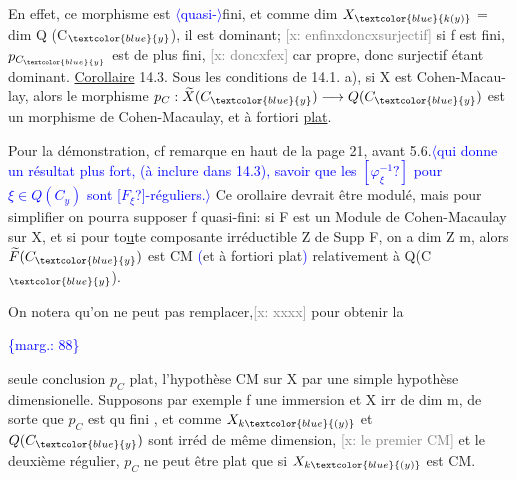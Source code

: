 \documentclass[11pt]{article}
\newcommand{\scanpage}[1]{\par\bigskip\noindent{\small\sffamily[scan #1]}\par}
\newcommand{\hand}[1]{\textcolor{blue}{#1}}
\let\over\relax
\newcommand{\over}[2]{\textcolor{gray}{#1}\textcolor{blue}{\ensuremath{^{\!\nearrow}}#2}}
\newcommand{\inserted}[2][]{\textcolor{blue}{$\langle$#2$\rangle$}}
\newcommand{\margin}[1]{\textcolor{blue}{\{\textsf{marg.:} #1\}}}
\newcommand{\xout}[1]{\textcolor{gray}{[\textsf{x:} #1]}}
\newcommand{\uline}[1]{\underline{#1}}
\newcommand{\unsure}[1]{[#1?]}
\begin{document}
En effet, ce morphisme est \inserted{quasi-}fini, et comme dim $X_{\hand{k(y)}}$ = dim Q (C$_{\hand{y}}$), il est
dominant; \xout{enfinxdoncxsurjectif} si f est fini, $p_{C_{\hand{y}}}$ est de plus fini,
\xout{doncxfex} car propre, donc surjectif étant dominant.
\uline{Corollaire} 14.3. Sous les conditions de 14.1. a), si X est Cohen-Macau-%
lay, alors le morphisme $p_{C} : \widetilde{X}(C_{\hand{y}}) \longrightarrow Q(C_{\hand{y}})$ est un morphisme de
Cohen-Macaulay, et à fortiori \uline{plat}.

Pour la démonstration, cf remarque en haut de la page 21, avant 5.6.\inserted{qui donne un résultat plus fort, (à inclure dans 14.3), savoir que les $\unsure{\varphi^{-1}_{\xi}}$ pour $\xi\in Q(C_{y})$ sont \unsure{$F_{\xi}$}-réguliers.}
Ce \over{c}{C}orollaire devrait être modulé, mais pour simplifier on pourra
supposer f quasi-fini: si F est un Module de Cohen-Macaulay sur X, et si
pour to\uline{u}te composante irréductible Z de Supp F, on a dim Z \over{>}{$\geqslant$} m, alors
$\widetilde{F}(C_{\hand{y}})$ est CM \hand{(}et à fortiori plat\hand{)} relativement à Q(C$_{\hand{y}}$).

On notera qu'on ne peut pas remplacer,\xout{xxxx} pour obtenir la

\margin{88}

\clearpage
\scanpage{25/89}
seule conclusion $p_C$ plat, l'hypothèse CM sur X par une simple hypothèse
dimensionelle. Supposons par exemple f une immersion et X irr de dim m,
de sorte que $p_C$ est qu fini , et comme $X_{k\hand{(y)}}$ et $Q(C_{\hand{y}})$ sont irréd de
même dimension, \xout{le premier CM} et le deuxième régulier, $p_C$ ne peut être
plat que si $X_{k\hand{(y)}}$ est CM.
\end{document}
